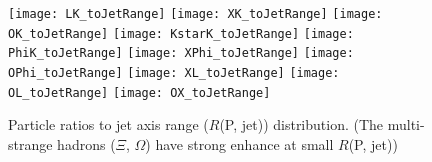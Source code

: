 \begin{figure}[ht]
	\begin{center}
                \texttt{[image: LK\_toJetRange]}
                \texttt{[image: XK\_toJetRange]}
                \texttt{[image: OK\_toJetRange]}
                \texttt{[image: KstarK\_toJetRange]}
                \texttt{[image: PhiK\_toJetRange]}
                \texttt{[image: XPhi\_toJetRange]}
                \texttt{[image: OPhi\_toJetRange]}
                \texttt{[image: XL\_toJetRange]}
                \texttt{[image: OL\_toJetRange]}
                \texttt{[image: OX\_toJetRange]}
	\end{center}
	\caption{Particle ratios to jet axis range ($R$(P, jet)) distribution. (The multi-strange hadrons ($\Xi$, $\Omega$) have strong enhance at small $R$(P, jet))}
	\label{fig:ParRatiotoJet}
\end{figure}
